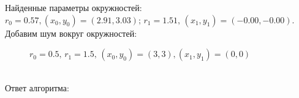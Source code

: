 Найденные параметры окружностей: $r_0 = 0.57, (x_0, y_0) = (2.91, 3.03); \, r_1 = 1.51, \, (x_1, y_1) = (-0.00, -0.00)$. \newpage
Добавим шум вокруг окружностей: \\
\begin{figure}[h]
\caption{$r_0 = 0.5, \, r_1 = 1.5, \, (x_0, y_0) = (3, 3), (x_1, y_1) = (0, 0)$}
\end{figure} \\
Ответ алгоритма: \\
\begin{figure}[h]
\end{figure}\\
